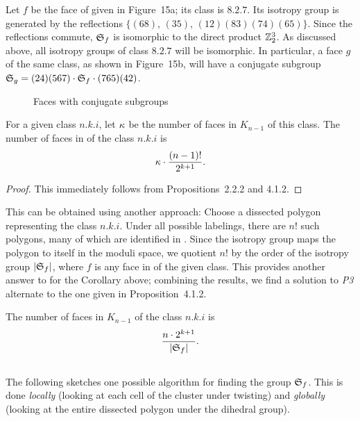 \documentclass[10pt]{amsart}
\begin{document}
        \begin{exmp}
        Let $f$ be the face of  given in Figure~15a; its class is $8.2.7$.  Its isotropy group is generated by the reflections $\{(68),\, (35),\, (12)(83)(74)(65)\}$. Since the reflections commute,  ${\mathfrak S}_f$ is isomorphic to the direct product ${\mathbb Z}_2^3$. As discussed above, all isotropy groups of class $8.2.7$ will be isomorphic.  In particular, a face $g$ of the same class, as shown in Figure~15b, will have a conjugate subgroup  ${\mathfrak S}_g = (24)(567) \cdot {\mathfrak S}_f \cdot (765)(42)$.
        \label{e:isotropy}
        \end{exmp}
        
        \begin{figure}[h]
        \caption{Faces with conjugate subgroups}
        \label{isotropy}
        \end{figure}
        
        \begin{cor}
        For a given class $n.k.i$, let $\kappa$ be the number of faces in $K_{n-1}$ of this class.  The number of faces in  of the class $n.k.i$ is
        $$\kappa \cdot \frac{(n-1)!}{2^{k+1}}.$$
        \end{cor}
        
        \begin{proof}
        This immediately follows from Propositions~2.2.2 and 4.1.2.
        \end{proof}
        
        This can be obtained using another approach:  Choose a dissected polygon representing the class $n.k.i$.  Under all possible labelings, there are $n!$ such polygons, many of which are identified in .  Since the isotropy group maps the polygon to itself in the moduli space, we quotient $n!$ by the order of the isotropy group $|{\mathfrak S}_f|$, where $f$ is any face in  of the given class.  This provides another answer to for the Corollary above; combining the results, we find a solution to {\em P3}\, alternate to the one given in Proposition~4.1.2.
        
        \begin{prop}
        The number of faces in $K_{n-1}$ of the class $n.k.i$ is 
        $$\frac{n \cdot 2^{k+1}}{ |{\mathfrak S}_f|}.$$
        \label{p:new}
        \end{prop}
        
                
        \subsection{}
        The following sketches one possible algorithm for finding the group ${\mathfrak S}_f$.  This is done {\em locally} (looking at each cell of the cluster under twisting) and {\em globally} (looking at the entire dissected polygon under the dihedral group).
        
\end{document}
